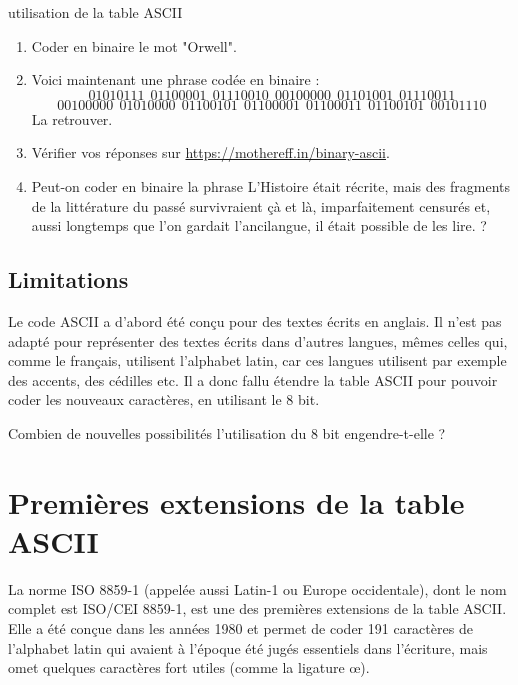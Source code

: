 \documentclass[a4paper,dvipsnames]{article}
\begin{document}
\medskip

\begin{activite}{utilisation de la table ASCII}{}
  \begin{enumerate}
    \item Coder en binaire le mot "Orwell".
    \item Voici maintenant une phrase codée en binaire : 
      \[01010111\ \ 01100001\ \ 01110010\ \ 00100000\ \ 01101001\ \ 01110011\] 
      \[00100000\ \  01010000\ \ 01100101\ \ 01100001\ \ 01100011\ \ 01100101\ \ 00101110\] 
      La retrouver.
    \item Vérifier vos réponses sur \url{https://mothereff.in/binary-ascii}.
    \item Peut-on coder en binaire la phrase \og{}L’Histoire était récrite, mais des fragments de la littérature du passé survivraient çà et là, imparfaitement censurés et, aussi longtemps que l’on gardait l’ancilangue, il était possible de les lire.\fg{} ?  
  \end{enumerate}
\end{activite}

\subsection{Limitations}

Le code ASCII  a d'abord été conçu pour des textes écrits en anglais. Il n'est pas adapté pour représenter des textes écrits dans d'autres langues, mêmes celles qui, comme le français, utilisent l'alphabet latin, car ces langues utilisent par exemple des accents, des cédilles etc. Il a donc fallu étendre la table ASCII pour pouvoir coder les nouveaux caractères, en utilisant le 8\ieme{} bit.

\medskip

\begin{exercice}{}{}
  Combien de nouvelles possibilités l'utilisation du 8\ieme{} bit engendre-t-elle ?
\end{exercice}

\section{Premières extensions de la table ASCII}

La norme ISO 8859-1 (appelée aussi Latin-1 ou Europe occidentale), dont le nom complet est ISO/CEI 8859-1, est une des premières extensions de la table ASCII. Elle a été conçue dans les années 1980 et permet de coder 191 caractères de l'alphabet latin qui avaient à l'époque été jugés essentiels dans l'écriture, mais omet quelques caractères fort utiles (comme la ligature \oe).
\end{document}
